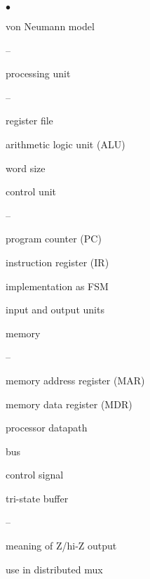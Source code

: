 \begin{minipage}[t]{3.1in}
\begin{list}{$\bullet$}{\setlength{\itemsep}{0pt}\setlength{\parskip}{0pt}%
\setlength{\topsep}{0pt}\setlength{\partopsep}{0pt}\setlength{\parsep}{0pt}}

\item{von Neumann model
\begin{list}{--}{\setlength{\itemsep}{0pt}\setlength{\parskip}{0pt}%
\setlength{\topsep}{0pt}\setlength{\partopsep}{0pt}\setlength{\parsep}{0pt}}
\item{processing unit
\begin{list}{--}{\setlength{\itemsep}{0pt}\setlength{\parskip}{0pt}%
\setlength{\topsep}{0pt}\setlength{\partopsep}{0pt}\setlength{\parsep}{0pt}}
\item register file
\item arithmetic logic unit (ALU)
\item word size
\end{list}
}
\item{control unit
\begin{list}{--}{\setlength{\itemsep}{0pt}\setlength{\parskip}{0pt}%
\setlength{\topsep}{0pt}\setlength{\partopsep}{0pt}\setlength{\parsep}{0pt}}
\item program counter (PC)
\item instruction register (IR)
\item implementation as FSM
\end{list}
}
\item input and output units
\item{memory
\begin{list}{--}{\setlength{\itemsep}{0pt}\setlength{\parskip}{0pt}%
\setlength{\topsep}{0pt}\setlength{\partopsep}{0pt}\setlength{\parsep}{0pt}}
\item memory address register (MAR)
\item memory data register (MDR)
\end{list}
}
\item{processor datapath}
\item{bus}
\item{control signal}
\end{list}
}

\item{tri-state buffer
\begin{list}{--}{\setlength{\itemsep}{0pt}\setlength{\parskip}{0pt}%
\setlength{\topsep}{0pt}\setlength{\partopsep}{0pt}\setlength{\parsep}{0pt}}
\item meaning of Z/hi-Z output
\item use in distributed mux
\end{list}
}


\end{list}
\end{minipage}
